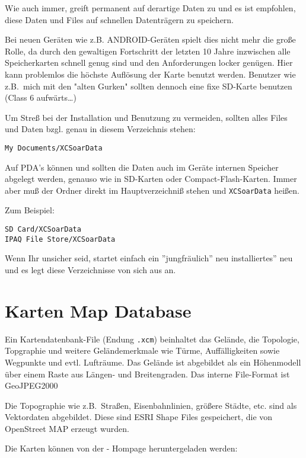 Wie auch immer, \xc greift permanent auf derartige Daten zu und es ist empfohlen, diese Daten und
Files auf schnellen Datenträgern zu speichern.

Bei neuen Geräten wie z.B. ANDROID-Geräten spielt dies nicht mehr die große Rolle, da durch den
gewaltigen Fortschritt der letzten 10 Jahre inzwischen alle  Speicherkarten schnell genug sind und den
Anforderungen locker genügen. Hier kann problemlos die höchste Auflösung der Karte benutzt werden.
Benutzer wie z.B.\ mich mit den "alten Gurken" sollten dennoch eine fixe SD-Karte benutzen (Class 6
aufwärts\dots)

Um Streß bei der Installation und Benutzung zu vermeiden, sollten alles Files und Daten bzgl. \xc  genau in
diesem Verzeichnis stehen:

\begin{verbatim}
My Documents/XCSoarData
\end{verbatim}

Auf PDA's können und sollten die Daten auch im Geräte internen Speicher abgelegt werden, genauso wie in
SD-Karten oder Compact-Flash-Karten. Immer aber muß der Ordner direkt im Hauptverzeichniß stehen und
\verb|XCSoarData| heißen.

Zum Beispiel:
\begin{verbatim}
SD Card/XCSoarData
IPAQ File Store/XCSoarData
\end{verbatim}

Wenn Ihr unsicher seid, startet einfach ein ''jungfräulich'' neu installiertes'' \xc neu und es legt diese
Verzeichnisse von sich aus an.

\section{Karten Map Database}\label{sec:map}

Ein Kartendatenbank-File (Endung \verb|.xcm|) beinhaltet das Gelände, die Topologie, Topgraphie und
weitere Geländemerkmale wie Türme, Auffälligkeiten sowie Wegpunkte und evtl. Lufträume.  Das
Gelände ist abgebildet als ein Höhenmodell über einem Raste aus Längen- und Breitengraden. Das interne
File-Format ist GeoJPEG2000

Die Topographie wie z.B.\ Straßen, Eisenbahnlinien, größere Städte, etc. sind als Vektordaten abgebildet.
Diese sind ESRI Shape Files gespeichert, die von OpenStreet MAP erzeugt wurden.

Die Karten können von der  \xc - Hompage heruntergeladen werden:


